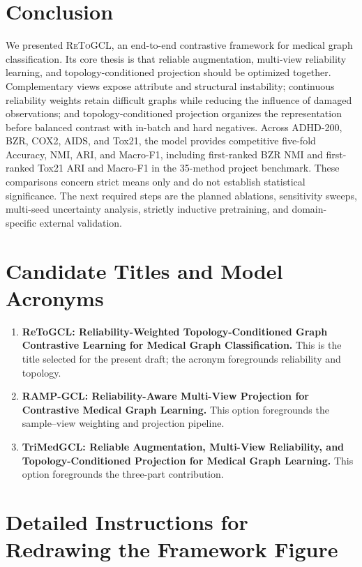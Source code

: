 \documentclass[10pt,twocolumn]{article}
\newcommand{\method}{\textsc{ReToGCL}}
\begin{document}
\section{Conclusion}

We presented \method{}, an end-to-end contrastive framework for medical graph classification. Its core thesis is that reliable augmentation, multi-view reliability learning, and topology-conditioned projection should be optimized together. Complementary views expose attribute and structural instability; continuous reliability weights retain difficult graphs while reducing the influence of damaged observations; and topology-conditioned projection organizes the representation before balanced contrast with in-batch and hard negatives. Across ADHD-200, BZR, COX2, AIDS, and Tox21, the model provides competitive five-fold Accuracy, NMI, ARI, and Macro-F1, including first-ranked BZR NMI and first-ranked Tox21 ARI and Macro-F1 in the 35-method project benchmark. These comparisons concern strict means only and do not establish statistical significance. The next required steps are the planned ablations, sensitivity sweeps, multi-seed uncertainty analysis, strictly inductive pretraining, and domain-specific external validation.

\appendix

\section{Candidate Titles and Model Acronyms}

\begin{enumerate}[leftmargin=*]
    \item \textbf{ReToGCL: Reliability-Weighted Topology-Conditioned Graph Contrastive Learning for Medical Graph Classification.} This is the title selected for the present draft; the acronym foregrounds reliability and topology.
    \item \textbf{RAMP-GCL: Reliability-Aware Multi-View Projection for Contrastive Medical Graph Learning.} This option foregrounds the sample--view weighting and projection pipeline.
    \item \textbf{TriMedGCL: Reliable Augmentation, Multi-View Reliability, and Topology-Conditioned Projection for Medical Graph Learning.} This option foregrounds the three-part contribution.
\end{enumerate}

\section{Detailed Instructions for Redrawing the Framework Figure}
\end{document}
